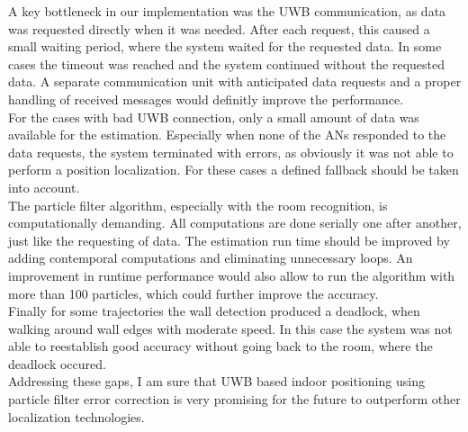 A key bottleneck in our implementation was the UWB communication, as data was requested directly when it was needed. After each request, this caused a small waiting period, where the system waited for the requested data. In some cases the timeout was reached and the system continued without the requested data. A separate communication unit with anticipated data requests and a proper handling of received messages would definitly improve the performance.\\
\noindent\hspace*{5mm}%
For the cases with bad UWB connection, only a small amount of data was available for the estimation. Especially when none of the ANs responded to the data requests, the system terminated with errors, as obviously it was not able to perform a position localization. For these cases a defined fallback should be taken into account.\\
\noindent\hspace*{5mm}%
The particle filter algorithm, especially with the room recognition, is computationally demanding. All computations are done serially one after another, just like the requesting of data. The estimation run time should be improved by adding contemporal computations and eliminating unnecessary loops. An improvement in runtime performance would also allow to run the algorithm with more than 100 particles, which could further improve the accuracy.\\
\noindent\hspace*{5mm}%
Finally for some trajectories the wall detection produced a deadlock, when walking around wall edges with moderate speed. In this case the system was not able to reestablish good accuracy without going back to the room, where the deadlock occured.\\\noindent\hspace*{5mm}%
Addressing these gaps, I am sure that UWB based indoor positioning using particle filter error correction is very promising for the future to outperform other localization technologies.